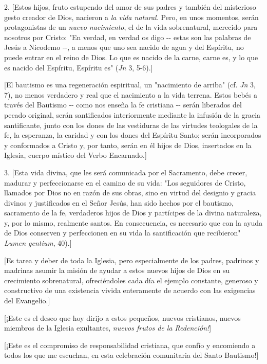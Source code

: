 2. {[}Estos hijos, fruto estupendo del amor de sus padres y también del
misterioso gesto creador de Dios, nacieron a \emph{la vida natural.}
Pero, en unos momentos, serán protagonistas de un \emph{nuevo
	nacimiento}, el de la vida sobrenatural, merecido para nosotros por
Cristo: "En verdad, en verdad os digo -\/- estas son las palabras de
Jesús a Nicodemo -\/-, a menos que uno sea nacido de agua y del
Espíritu, no puede entrar en el reino de Dios. Lo que es nacido de la
carne, carne es, y lo que es nacido del Espíritu, Espíritu es"
(\emph{Jn} 3, 5-6).{]}

{[}El bautismo es una regeneración espiritual, un "nacimiento de arriba"
(cf. \emph{Jn} 3, 7), no menos verdadero y real que el nacimiento a la
vida terrena. Estos bebés a través del Bautismo -\/- como nos enseña la
fe cristiana -\/- serán liberados del pecado original, serán
santificados interiormente mediante la infusión de la gracia
santificante, junto con los dones de las vestiduras de las virtudes
teologales de la fe, la esperanza, la caridad y con los dones del
Espíritu Santo; serán incorporados y conformados a Cristo y, por tanto,
serán en él hijos de Dios, insertados en la Iglesia, cuerpo místico del
Verbo Encarnado.{]}

3. {[}Esta vida divina, que les será comunicada por el Sacramento, debe
crecer, madurar y perfeccionarse en el camino de su vida: "Los
seguidores de Cristo, llamados por Dios no en razón de sus obras, sino
en virtud del designio y gracia divinos y justificados en el Señor
Jesús, han sido hechos por el bautismo, sacramento de la fe, verdaderos
hijos de Dios y partícipes de la divina naturaleza, y, por lo mismo,
realmente santos. En consecuencia, es necesario que con la ayuda de Dios
conserven y perfeccionen en su vida la santificación que recibieron" \emph{Lumen
			gentium}, 40).{]}

{[}Es tarea y deber de toda la Iglesia, pero especialmente de los
padres, padrinos y madrinas asumir la misión de ayudar a estos nuevos
hijos de Dios en su crecimiento sobrenatural, ofreciéndoles cada día el
ejemplo constante, generoso y constructivo de una existencia vivida
enteramente de acuerdo con las exigencias del Evangelio.{]}

{[}¡Este es el deseo que hoy dirijo a estos pequeños, nuevos cristianos,
nuevos miembros de la Iglesia exultantes, \emph{nuevos frutos de la
	Redención!}{]}

{[}¡Este es el compromiso de responsabilidad cristiana, que confío y
encomiendo a todos los que me escuchan, en esta celebración comunitaria
del Santo Bautismo!{]}

